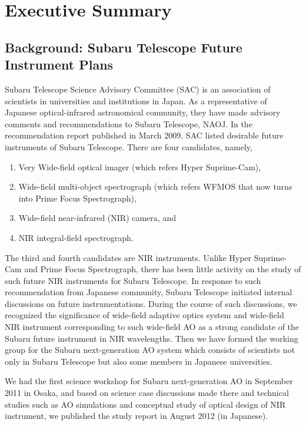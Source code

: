 \chapter{Executive Summary
\label{chap:exec_summary}}

\section{Background: Subaru Telescope Future Instrument Plans}

Subaru Telescope Science Advisory Committee (SAC) is an association of 
scientists in universities and institutions in Japan. As a
representative of Japanese optical-infrared astronomical community, they 
have made advisory comments and recommendations to Subaru Telescope,
NAOJ.
In the recommendation report published in March 2009, SAC listed
desirable future instruments of Subaru Telescope. There
are four candidates, namely,

\begin{enumerate}
\setlength{\itemsep}{-3pt}
\item Very Wide-field optical imager (which refers Hyper Suprime-Cam),
\item Wide-field multi-object spectrograph (which refers WFMOS that now
      turns into Prime Focus Spectrograph), 
\item Wide-field near-infrared (NIR) camera, and 
\item NIR integral-field spectrograph.
\end{enumerate}

The third and fourth candidates are NIR instruments. Unlike Hyper
Suprime-Cam and Prime Focus Spectrograph, there has been little activity
on the study of such future NIR instruments for Subaru Telescope.
In response to such recommendation from Japanese community, Subaru
Telescope initiated internal discussions on future instrumentations. 
During the course of such discussions, we recognized the significance of
wide-field adaptive optics system and wide-field NIR instrument
corresponding to such wide-field AO as a strong candidate of the Subaru
future instrument in NIR wavelengths.
Then we have formed the working group for the Subaru next-generation AO
system which consists of scientists not only in Subaru Telescope but
also some members in Japanese universities.

We had the first science workshop for Subaru next-generation AO in
September 2011 in Osaka, and based on science case discussions made
there and technical studies such as AO simulations and conceptual study
of optical design of NIR instrument, we published the study report in
August 2012 (in Japanese). 

